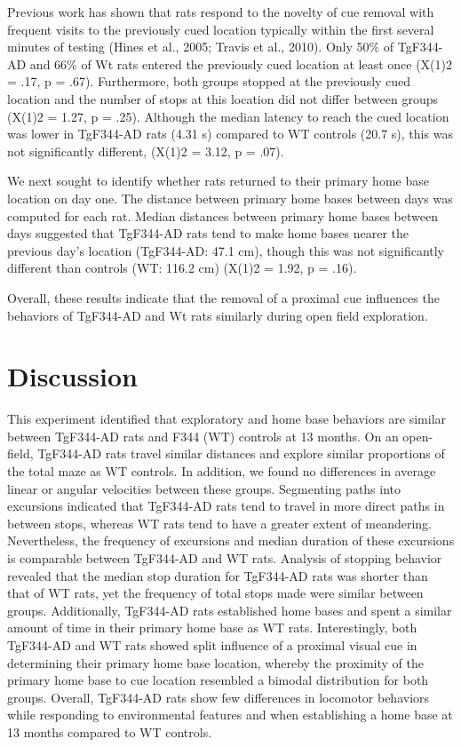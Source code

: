 \documentclass[fleqn,10pt]{wlscirep}
\begin{document}
Previous work has shown that rats respond to the novelty of cue removal with frequent visits to the previously cued location typically within the first several minutes of testing \cite{hines_home_2005}(Hines et al., 2005; Travis et al., 2010). Only 50\% of TgF344-AD and 66\% of Wt rats entered the previously cued location at least once (X(1)2 = .17, p = .67). Furthermore, both groups stopped at the previously cued location and the number of stops at this location did not differ between groups (X(1)2 = 1.27, p = .25). Although the median latency to reach the cued location was lower in TgF344-AD rats (4.31 s) compared to WT controls (20.7 s), this was not significantly different, (X(1)2 = 3.12, p = .07). 

We next sought to identify whether rats returned to their primary home base location on day one. The distance between primary home bases between days was computed for each rat. Median distances between primary home bases between days suggested that TgF344-AD rats tend to make home bases nearer the previous day’s location (TgF344-AD: 47.1 cm), though this was not significantly different than controls (WT: 116.2 cm) (X(1)2 = 1.92, p = .16). 

Overall, these results indicate that the removal of a proximal cue influences the behaviors of TgF344-AD and Wt rats similarly during open field exploration. 

\section*{Discussion}

This experiment identified that exploratory and home base behaviors are similar between TgF344-AD rats and F344 (WT) controls at 13 months. On an open-field, TgF344-AD rats travel similar distances and explore similar proportions of the total maze as WT controls. In addition, we found no differences in average linear or angular velocities between these groups. Segmenting paths into excursions indicated that TgF344-AD rats tend to travel in more direct paths in between stops, whereas WT rats tend to have a greater extent of meandering. Nevertheless, the frequency of excursions and median duration of these excursions is comparable between TgF344-AD and WT rats. Analysis of stopping behavior revealed that the median stop duration for TgF344-AD rats was shorter than that of WT rats, yet the frequency of total stops made were similar between groups. Additionally, TgF344-AD rats established home bases and spent a similar amount of time in their primary home base as WT rats. Interestingly, both TgF344-AD and WT rats showed split influence of a proximal visual cue in determining their primary home base location, whereby the proximity of the primary home base to cue location resembled a bimodal distribution for both groups. Overall, TgF344-AD rats show few differences in locomotor behaviors while responding to environmental features and when establishing a home base at 13 months compared to WT controls. 
\end{document}
